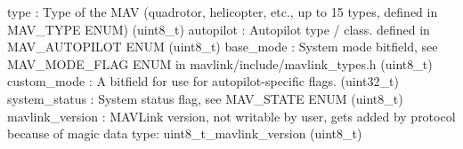 \begin{DoxyVerb}
\begin{DoxyVerb}
\begin{DoxyVerb}
type                      : Type of the MAV (quadrotor, helicopter, etc., up to 15 types, defined in MAV_TYPE ENUM) (uint8_t)
autopilot                 : Autopilot type / class. defined in MAV_AUTOPILOT ENUM (uint8_t)
base_mode                 : System mode bitfield, see MAV_MODE_FLAG ENUM in mavlink/include/mavlink_types.h (uint8_t)
custom_mode               : A bitfield for use for autopilot-specific flags. (uint32_t)
system_status             : System status flag, see MAV_STATE ENUM (uint8_t)
mavlink_version           : MAVLink version, not writable by user, gets added by protocol because of magic data type: uint8_t_mavlink_version (uint8_t)\end{DoxyVerb}
 \mbox{\label{classpymavlink_1_1dialects_1_1v10_1_1MAVLink_a0b32dabfb993c6a0717c17f759e73c92}} 

\end{DoxyVerb}
\end{DoxyVerb}
